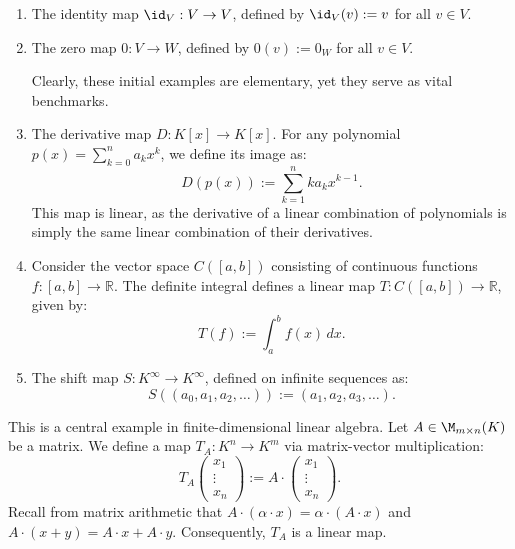 \begin{example}
\label{ex:fundamental_linear_maps}
\begin{enumerate}
    \item The identity map $\id_V: V \to V$, defined by $\id_V(v) := v$ for all $v \in V$.
    \item The zero map $0: V \to W$, defined by $0(v) := 0_W$ for all $v \in V$. 
    
    Clearly, these initial examples are elementary, yet they serve as vital benchmarks.
    
    \item The derivative map $D: K[x] \to K[x]$. For any polynomial $p(x) = \sum_{k=0}^n a_k x^k$, we define its image as:
    \[
    D(p(x)) := \sum_{k=1}^n k a_k x^{k-1}.
    \]
    This map is linear, as the derivative of a linear combination of polynomials is simply the same linear combination of their derivatives.
    
    \item Consider the vector space $C([a, b])$ consisting of continuous functions $f: [a, b] \to \mathbb{R}$. The definite integral defines a linear map $T: C([a, b]) \to \mathbb{R}$, given by:
    \[
    T(f) := \int_a^b f(x) \, dx.
    \]
    
    \item The shift map $S: K^\infty \to K^\infty$, defined on infinite sequences as:
    \[
    S((a_0, a_1, a_2, \dots)) := (a_1, a_2, a_3, \dots).
    \]
\end{enumerate}
\end{example}

\begin{example}
\label{ex:matrix_transformation}
This is a central example in finite-di\-men\-sional linear algebra. Let $A \in \M_{m \times n}(K)$ be a matrix. We define a map $T_A: K^n \to K^m$ via matrix-vector multiplication:
\[
T_A \left(\begin{smallmatrix} x_1 \\ \vdots \\ x_n \end{smallmatrix}\right) := A \cdot \left(\begin{smallmatrix} x_1 \\ \vdots \\ x_n \end{smallmatrix}\right).
\]
Recall from matrix arithmetic that $A \cdot (\alpha \cdot x) = \alpha \cdot (A \cdot x)$ and $A \cdot (x + y) = A \cdot x + A \cdot y$. Consequently, $T_A$ is a linear map.
\end{example}

